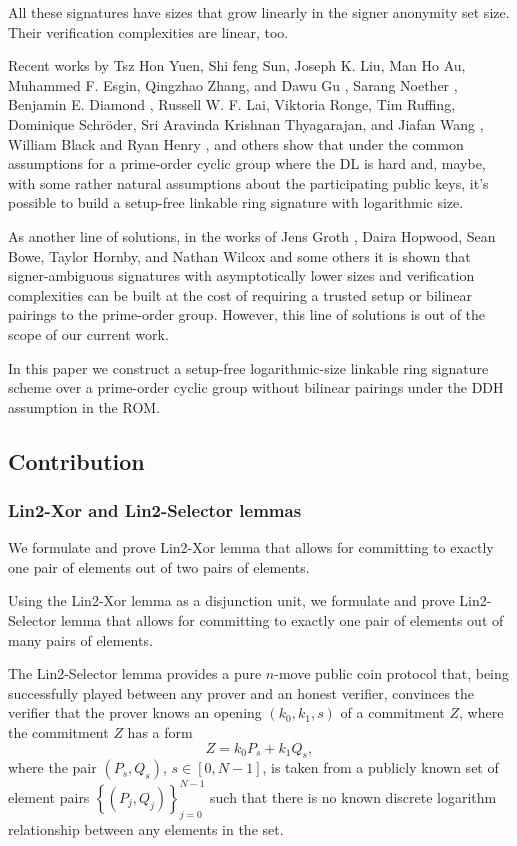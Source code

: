 \documentclass{mathcryptology} %
\theoremstyle{title}
\theoremstyle{titleof}
\begin{document}
    All these signatures have sizes that grow linearly in the signer anonymity set size. Their verification complexities are linear, too.

    Recent works by Tsz Hon Yuen, Shi feng Sun, Joseph K. Liu, Man Ho Au, Muhammed F. Esgin, Qingzhao Zhang, and Dawu Gu \cite{18}, Sarang Noether \cite{14}, Benjamin E. Diamond \cite{6}, Russell W. F. Lai, Viktoria Ronge, Tim Ruffing, Dominique Schröder, Sri Aravinda Krishnan Thyagarajan, and Jiafan Wang \cite{12}, William Black and Ryan Henry \cite{3}, and others show that under the common assumptions for a prime-order cyclic group where the DL is hard and, maybe, with some rather natural assumptions about the participating public keys, it's possible to build a setup-free linkable ring signature with logarithmic size.

    As another line of solutions, in the works of Jens Groth \cite{10}, Daira Hopwood, Sean Bowe, Taylor Hornby, and Nathan Wilcox \cite{11} and some others it is shown that signer-ambiguous signatures with asymptotically lower sizes and verification complexities can be built at the cost of requiring a trusted setup or bilinear pairings to the prime-order group. However, this line of solutions is out of the scope of our current work.

    In this paper we construct a setup-free logarithmic-size linkable ring signature scheme over a prime-order cyclic group without bilinear pairings under the DDH assumption in the ROM.


\subsection{Contribution}


\subsubsection{Lin2-Xor and Lin2-Selector lemmas}
    We formulate and prove Lin2-Xor lemma that allows for committing to exactly one pair of elements out of two pairs of elements.

    Using the Lin2-Xor lemma as a disjunction unit, we formulate and prove Lin2-Selector lemma that allows for committing to exactly one pair of elements out of many pairs of elements.

    The Lin2-Selector lemma provides a pure $n$-move public coin protocol that, being successfully played between any prover and an honest verifier, convinces the verifier that the prover knows an opening $\left({k}_{0},{k}_{1},s\right)$ of a commitment $Z$, where the commitment $Z$ has a form 
    \begin{equation*}
        Z=k_{0} P_{s} +k_{1} Q_{s},
    \end{equation*}    
    where the pair $\left(P_{s}, Q_{s}\right)$, $s \in \left[0, N-1\right]$, is taken from a publicly known set of element pairs ${\left\{\left(P_{j},{Q}_{j}\right)\right\}}_{j=0}^{N-1}$ such that there is no known discrete logarithm relationship between any elements in the set.
\end{document}
